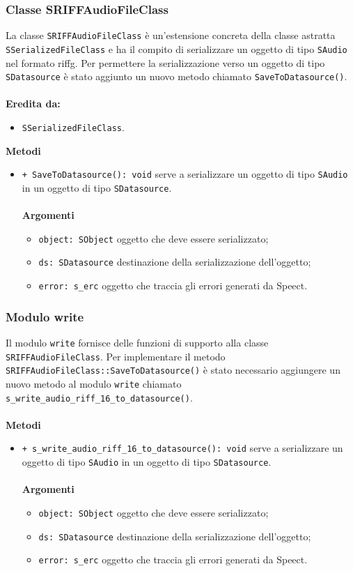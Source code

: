 \subsubsection{Classe SRIFFAudioFileClass}
La classe \texttt{SRIFFAudioFileClass} è un'estensione concreta della classe astratta \texttt{SSerializedFileClass} e ha il compito di serializzare un oggetto di tipo \texttt{SAudio} nel formato \gls{riffg}.
Per permettere la serializzazione verso un oggetto di tipo \texttt{SDatasource} è stato aggiunto un nuovo metodo chiamato \texttt{SaveToDatasource()}.\\\\
\textbf{Eredita da:}
\begin{itemize}
	\item \texttt{SSerializedFileClass}.
\end{itemize}
\textbf{Metodi}
\begin{itemize}
	\item \texttt{+ SaveToDatasource(): void} serve a serializzare un oggetto di tipo \texttt{SAudio} in un oggetto di tipo \texttt{SDatasource}.\\\\
	\textbf{Argomenti}
	\begin{itemize}
		\item \texttt{object: SObject} oggetto che deve essere serializzato;
		\item \texttt{ds: SDatasource} destinazione della serializzazione dell'oggetto;
		\item \texttt{error: s\_erc} oggetto che traccia gli errori generati da Speect.
	\end{itemize}
\end{itemize}

\subsubsection{Modulo write}
Il modulo \texttt{write} fornisce delle funzioni di supporto alla classe \texttt{SRIFFAudioFileClass}. Per implementare il metodo \texttt{SRIFFAudioFileClass::SaveToDatasource()} è stato necessario aggiungere un nuovo metodo al modulo \texttt{write} chiamato\\\texttt{s\_write\_audio\_riff\_16\_to\_datasource()}.\\\\
\textbf{Metodi}
\begin{itemize}
	\item \texttt{+ s\_write\_audio\_riff\_16\_to\_datasource(): void} serve a serializzare un oggetto di tipo \texttt{SAudio} in un oggetto di tipo \texttt{SDatasource}.\\\\
	\textbf{Argomenti}
	\begin{itemize}
		\item \texttt{object: SObject} oggetto che deve essere serializzato;
		\item \texttt{ds: SDatasource} destinazione della serializzazione dell'oggetto;
		\item \texttt{error: s\_erc} oggetto che traccia gli errori generati da Speect.
	\end{itemize}
\end{itemize}

